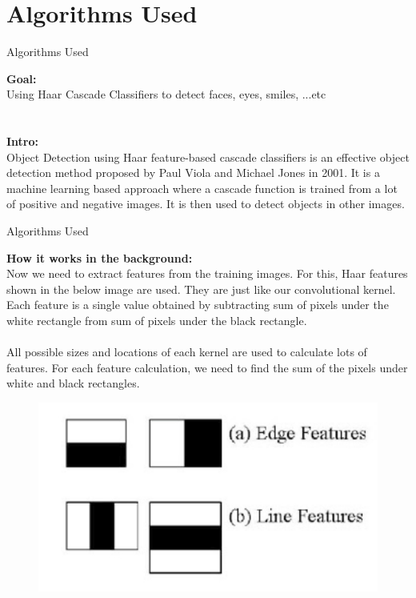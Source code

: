 \documentclass[10pt]{beamer}
\newcommand\tab[1][0.5cm]{\hspace*{#1}}
\begin{document}
\section{Algorithms Used}
\begin{frame}{Algorithms Used}

\textbf{Goal:} \\
\tab Using Haar Cascade Classifiers to detect faces, eyes, smiles, ...etc \\~\\~\\

\textbf{Intro:} \\
\tab Object Detection using Haar feature-based cascade classifiers is an effective object detection method proposed by Paul Viola and Michael Jones in 2001. It is a machine learning based approach where a cascade function is trained from a lot of positive and negative images. It is then used to detect objects in other images.
\end{frame}


\begin{frame}{Algorithms Used}


\textbf{How it works in the background:} \\
\tab Now we need to extract features from the training images. For this, Haar features shown in the below image are used. They are just like our convolutional kernel. Each feature is a single value obtained by subtracting sum of pixels under the white rectangle from sum of pixels under the black rectangle. \\~\\

All possible sizes and locations of each kernel are used to calculate lots of features. For each feature calculation, we need to find the sum of the pixels under white and black rectangles.

\begin{figure}
\vspace*{0cm}
\hspace*{0cm}
\includegraphics[scale=0.25]{images/kernel}
\end{figure}
\end{frame}
\end{document}
